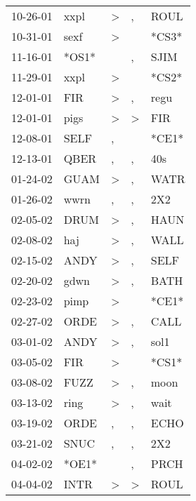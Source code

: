 \begin{supertabular}{lllll}
 10-26-01 &   xxpl &     \textgreater &                , &   ROUL \\
 10-31-01 &   sexf &     \textgreater &                  &  *CS3* \\
 11-16-01 &  *OS1* &                  &                , &   SJIM \\
 11-29-01 &   xxpl &     \textgreater &                  &  *CS2* \\
 12-01-01 &    FIR &     \textgreater &                , &   regu \\
 12-01-01 &   pigs &     \textgreater &     \textgreater &    FIR \\
 12-08-01 &   SELF &                , &                  &  *CE1* \\
 12-13-01 &   QBER &                , &                , &    40s \\
 01-24-02 &   GUAM &     \textgreater &                , &   WATR \\
 01-26-02 &   wwrn &                , &                , &    2X2 \\
 02-05-02 &   DRUM &     \textgreater &                , &   HAUN \\
 02-08-02 &    haj &     \textgreater &                , &   WALL \\
 02-15-02 &   ANDY &     \textgreater &                , &   SELF \\
 02-20-02 &   gdwn &     \textgreater &                , &   BATH \\
 02-23-02 &   pimp &     \textgreater &                  &  *CE1* \\
 02-27-02 &   ORDE &     \textgreater &                , &   CALL \\
 03-01-02 &   ANDY &     \textgreater &                , &   sol1 \\
 03-05-02 &    FIR &     \textgreater &                  &  *CS1* \\
 03-08-02 &   FUZZ &     \textgreater &                , &   moon \\
 03-13-02 &   ring &     \textgreater &                , &   wait \\
 03-19-02 &   ORDE &                , &                , &   ECHO \\
 03-21-02 &   SNUC &                , &                , &    2X2 \\
 04-02-02 &  *OE1* &                  &                , &   PRCH \\
 04-04-02 &   INTR &     \textgreater &     \textgreater &   ROUL \\

\end{supertabular}
